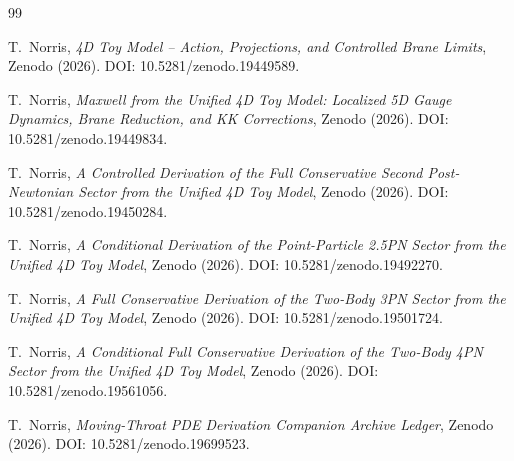 \documentclass[11pt]{article}
\theoremstyle{definition}
\begin{document}
\begin{thebibliography}{99}

T.~Norris,
\emph{4D Toy Model -- Action, Projections, and Controlled Brane Limits},
Zenodo (2026).
DOI: 10.5281/zenodo.19449589.

T.~Norris,
\emph{Maxwell from the Unified 4D Toy Model: Localized 5D Gauge Dynamics, Brane Reduction, and KK Corrections},
Zenodo (2026).
DOI: 10.5281/zenodo.19449834.

T.~Norris,
\emph{A Controlled Derivation of the Full Conservative Second Post-Newtonian Sector from the Unified 4D Toy Model},
Zenodo (2026).
DOI: 10.5281/zenodo.19450284.

T.~Norris,
\emph{A Conditional Derivation of the Point-Particle 2.5PN Sector from the Unified 4D Toy Model},
Zenodo (2026).
DOI: 10.5281/zenodo.19492270.

T.~Norris,
\emph{A Full Conservative Derivation of the Two-Body 3PN Sector from the Unified 4D Toy Model},
Zenodo (2026).
DOI: 10.5281/zenodo.19501724.

T.~Norris,
\emph{A Conditional Full Conservative Derivation of the Two-Body 4PN Sector from the Unified 4D Toy Model},
Zenodo (2026).
DOI: 10.5281/zenodo.19561056.

T.~Norris,
\emph{Moving-Throat PDE Derivation Companion Archive Ledger},
Zenodo (2026).
DOI: 10.5281/zenodo.19699523.

\end{thebibliography}
\end{document}
